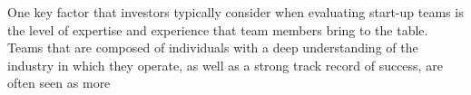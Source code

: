 \documentclass[12pt]{article}
\begin{document}
One key factor that investors typically consider when evaluating start-up teams is the level of expertise and experience that team members bring to the table. Teams that are composed of individuals with a deep understanding of the industry in which they operate, as well as a strong track record of success, are often seen as more




\clearpage



\end{document}
